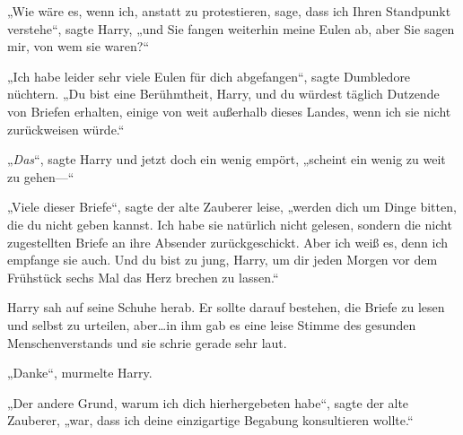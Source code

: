 „Wie wäre es, wenn ich, anstatt zu protestieren, sage, dass ich Ihren Standpunkt verstehe“, sagte Harry, „und Sie fangen weiterhin meine Eulen ab, aber Sie sagen mir, von wem sie waren?“

„Ich habe leider sehr viele Eulen für dich abgefangen“, sagte Dumbledore nüchtern. „Du bist eine Berühmtheit, Harry, und du würdest täglich Dutzende von Briefen erhalten, einige von weit außerhalb dieses Landes, wenn ich sie nicht zurückweisen würde.“

„\emph{Das}“, sagte Harry und jetzt doch ein wenig empört, „scheint ein wenig zu weit zu gehen—“

„Viele dieser Briefe“, sagte der alte Zauberer leise, „werden dich um Dinge bitten, die du nicht geben kannst. Ich habe sie natürlich nicht gelesen, sondern die nicht zugestellten Briefe an ihre Absender zurückgeschickt. Aber ich weiß es, denn ich empfange sie auch. Und du bist zu jung, Harry, um dir jeden Morgen vor dem Frühstück sechs Mal das Herz brechen zu lassen.“

Harry sah auf seine Schuhe herab. Er sollte darauf bestehen, die Briefe zu lesen und selbst zu urteilen, aber…in ihm gab es eine leise Stimme des gesunden Menschenverstands und sie schrie gerade sehr laut.

„Danke“, murmelte Harry.

„Der andere Grund, warum ich dich hierhergebeten habe“, sagte der alte Zauberer, „war, dass ich deine einzigartige Begabung konsultieren wollte.“


